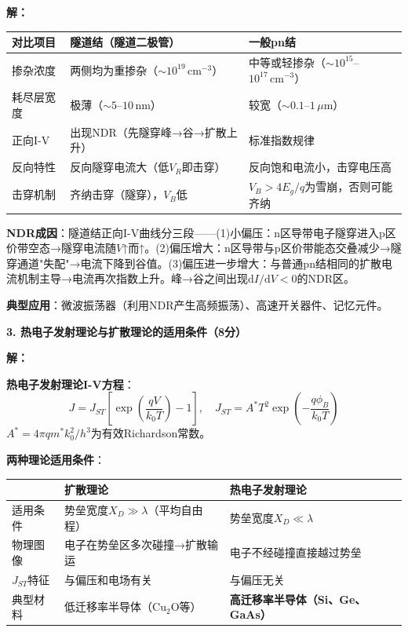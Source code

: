 \documentclass[12pt,a4paper]{ctexart}
\begin{document}
\textbf{解：}\quad

\begin{center}
\begin{tabular}{p{2.5cm}|p{5cm}|p{5cm}}
\toprule
\textbf{对比项目} & \textbf{隧道结（隧道二极管）} & \textbf{一般pn结} \\
\midrule
掺杂浓度 & 两侧均为重掺杂（$\sim10^{19}\,\text{cm}^{-3}$） & 中等或轻掺杂（$\sim10^{15}$--$10^{17}\,\text{cm}^{-3}$） \\
耗尽层宽度 & 极薄（$\sim5$--$10\,\text{nm}$） & 较宽（$\sim0.1$--$1\,\mu\text{m}$） \\
正向I-V & 出现NDR（先隧穿峰→谷→扩散上升） & 标准指数规律 \\
反向特性 & 反向隧穿电流大（低$V_R$即击穿） & 反向饱和电流小，击穿电压高 \\
击穿机制 & 齐纳击穿（隧穿），$V_B$低 & $V_B > 4E_g/q$为雪崩，否则可能齐纳 \\
\bottomrule
\end{tabular}
\end{center}

\textbf{NDR成因}：隧道结正向I-V曲线分三段——(1)小偏压：n区导带电子隧穿进入p区价带空态→隧穿电流随$V$↑而↑。(2)偏压增大：n区导带与p区价带能态交叠减少→隧穿通道"失配"→电流下降到谷值。(3)偏压进一步增大：与普通pn结相同的扩散电流机制主导→电流再次指数上升。峰→谷之间出现$\text{d}I/\text{d}V < 0$的NDR区。

\textbf{典型应用}：微波振荡器（利用NDR产生高频振荡）、高速开关器件、记忆元件。

\vspace{0.5cm}

\noindent\textbf{3. 热电子发射理论与扩散理论的适用条件（8分）}

\textbf{解：}\quad

\textbf{热电子发射理论I-V方程}：
\[
J = J_{ST}\left[\exp\left(\frac{qV}{k_0T}\right) - 1\right],\quad
J_{ST} = A^* T^2 \exp\left(-\frac{q\phi_B}{k_0T}\right)
\]
$A^* = 4\pi q m^* k_0^2/h^3$为有效Richardson常数。

\textbf{两种理论适用条件}：

\begin{center}
\begin{tabular}{p{3cm}|p{4.5cm}|p{4.5cm}}
\toprule
\textbf{} & \textbf{扩散理论} & \textbf{热电子发射理论} \\
\midrule
适用条件 & 势垒宽度$X_D \gg \lambda$（平均自由程） & 势垒宽度$X_D \ll \lambda$ \\
物理图像 & 电子在势垒区多次碰撞→扩散输运 & 电子不经碰撞直接越过势垒 \\
$J_{ST}$特征 & 与偏压和电场有关 & 与偏压无关 \\
典型材料 & 低迁移率半导体（Cu$_2$O等） & \textbf{高迁移率半导体（Si、Ge、GaAs）} \\
\bottomrule
\end{tabular}
\end{center}
\end{document}
